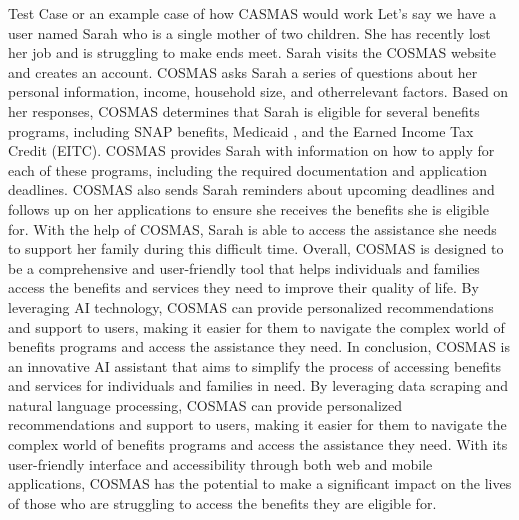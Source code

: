Test Case or an example case of how CASMAS would work
Let's say we have a user named Sarah who is a single mother of two children. She has recently lost her job and is struggling to make ends meet. Sarah visits the COSMAS website and creates an account. COSMAS asks Sarah a series of questions about her personal information, income, household size, and otherrelevant factors. Based on her responses, COSMAS determines that Sarah is eligible for several benefits programs, including SNAP benefits, Medicaid            
, and the Earned Income Tax Credit (EITC). COSMAS provides Sarah with information on how to apply for each of these programs, including the required documentation and application deadlines. COSMAS also sends Sarah reminders about upcoming deadlines and follows up on her applications to ensure she receives the benefits she is eligible for. With the help of COSMAS, Sarah is able to access the assistance she needs to support her family during this difficult time.            
Overall, COSMAS is designed to be a comprehensive and user-friendly tool that helps individuals and families access the benefits and services they need to improve their quality of life. By leveraging AI technology, COSMAS can provide personalized recommendations and support to users, making it easier for them to navigate the complex world of benefits programs and access the assistance they need.              
In conclusion, COSMAS is an innovative AI assistant that aims to simplify the process of accessing benefits and services for individuals and families in need. By leveraging data scraping and natural language processing, COSMAS can provide personalized recommendations and support to users, making it easier for them to navigate the complex world of benefits programs and access the assistance they need. With its user-friendly interface and accessibility through both web and mobile applications, COSMAS has the potential to make a significant impact on the lives of those who are struggling to access the benefits they are eligible for.   



